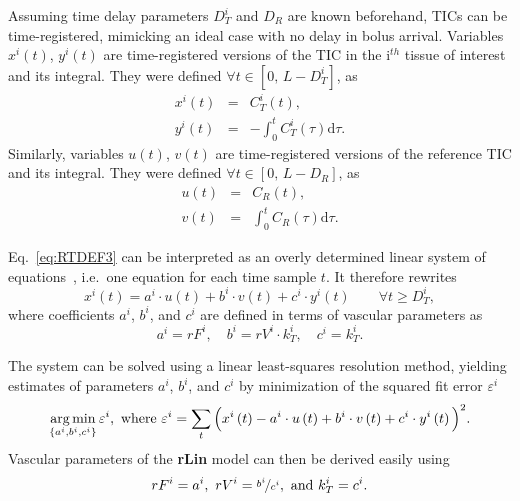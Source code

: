 Assuming time delay parameters $D_T^i$ and $D_R$ are known beforehand, TICs can be time-registered, mimicking an ideal case with no delay in bolus arrival.
Variables $x^i\left(t\right)$, $y^i\left(t\right)$ are time-registered versions of the TIC in the i$^{th}$ tissue of interest and its integral.
They were defined $\forall t \in \left[ 0,\,L-D_T^i\right]$, as
\begin{equation}
\begin{array}{rcl}
x^i\left(t\right) &=& C_{T}^i\left(t\right), \\
y^i\left(t\right) &=& -\int_0^{t} C_{T}^i \left( \tau \right) \mathrm d\tau.
\end{array}
\label{eq:RTLINV1}
\end{equation}
Similarly, variables $u\left(t\right)$, $v\left(t\right)$ are time-registered versions of the reference TIC and its integral.
They were defined $\forall t \in \left[ 0,\,L-D_R\right]$, as
\begin{equation}
\begin{array}{rcl}
u\left(t\right) &=& C_{R}\left(t\right), \\
v\left(t\right) &=& \int_0^t C_{R} \left(\tau\right) \mathrm d\tau.
\end{array}
\label{eq:RTLINV2}
\end{equation}

Eq.~\ref{eq:RTDEF3} can be interpreted as an overly determined linear system of equations~\cite{Bjorck:1996uz}, i.e.~one equation for each time sample $t$.
It therefore rewrites
\begin{equation}
x^i\left(t\right) = a^i \cdot u\left(t\right) + b^i \cdot v\left(t\right) + c^i \cdot y^i\left(t\right) \qquad \forall t \geq D_T^i,
\label{eq:RTLINF}
\end{equation}
where coefficients $a^i$, $b^i$, and $c^i$ are defined in terms of vascular parameters as
\begin{equation}
a^i = rF^i, \quad b^i = rV^i \cdot k_T^i, \quad c^i = k_T^i.
\label{eq:RTLINC}
\end{equation}

The system can be solved using a linear least-squares resolution method, yielding estimates of parameters $a^i$, $b^i$, and $c^i$ by minimization of the squared fit error $\varepsilon^i$
\begin{equation}
\operatorname*{arg\,min}_{\left\lbrace a^i, b^i, c^i\right\rbrace} \varepsilon^i, \textrm{ where } \varepsilon^i = \sum_t \Big( x^i\left(t\right) - a^i\cdot u\left(t\right) + b^i\cdot v\left(t\right) + c^i\cdot y^i\left(t\right) \Big)^2.
\end{equation}
Vascular parameters of the \textbf{rLin} model can then be derived easily using
\begin{equation}
rF^i = a^i,~rV^i = \nicefrac{b^i}{c^i}, \textrm{ and } k_T^i = c^i.
\end{equation}

